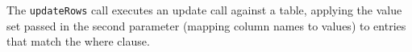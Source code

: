 The \verb+updateRows+ call executes an update call against a table, applying the value set passed in the
second parameter (mapping column names to values) to entries that match the where clause.
